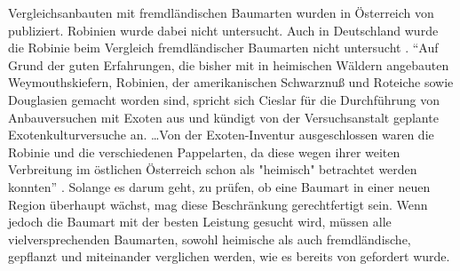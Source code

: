 \documentclass[twocolumn]{scrartcl}
\begin{document}
Vergleichsanbauten mit fremdländischen Baumarten wurden in Österreich
von \cite{cieslar1901FremdlaendischeHolzarten} publiziert. Robinien
wurde dabei nicht untersucht. Auch in Deutschland wurde die Robinie
beim Vergleich fremdländischer Baumarten
nicht untersucht \citep{schwappach1902fremdlaendischeHolzarten}.
\enquote{Auf Grund der guten Erfahrungen, die bisher mit in heimischen
Wäldern angebauten Weymouthskiefern, Robinien, der amerikanischen
Schwarznuß und Roteiche sowie Douglasien gemacht worden sind, spricht
sich Cieslar für die Durchführung von Anbauversuchen mit Exoten aus
und kündigt von der Versuchsanstalt geplante Exotenkulturversuche
an. \dots Von der Exoten-Inventur ausgeschlossen waren die Robinie und
die verschiedenen Pappelarten, da diese wegen ihrer weiten Verbreitung
im östlichen Österreich schon als "heimisch" betrachtet werden
konnten} \citep{rannert1979FremdlaendischeBaumarten}. Solange es
darum geht, zu prüfen, ob eine Baumart in einer neuen Region überhaupt
wächst, mag diese Beschränkung gerechtfertigt sein.
Wenn jedoch die Baumart mit der besten Leistung gesucht wird,
müssen alle vielversprechenden Baumarten,
sowohl heimische als auch fremdländische, gepflanzt und miteinander verglichen werden,
wie es bereits von \cite{reaumur1721ertragstafel} gefordert wurde.
\end{document}
